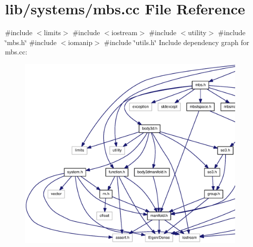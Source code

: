 \section{lib/systems/mbs.cc \-File \-Reference}
\label{mbs_8cc}
{\ttfamily \#include $<$limits$>$}\*
{\ttfamily \#include $<$iostream$>$}\*
{\ttfamily \#include $<$utility$>$}\*
{\ttfamily \#include \char`\"{}mbs.\-h\char`\"{}}\*
{\ttfamily \#include $<$iomanip$>$}\*
{\ttfamily \#include \char`\"{}utils.\-h\char`\"{}}\*
\-Include dependency graph for mbs.\-cc\-:
\nopagebreak
\begin{figure}[H]
\begin{center}
\leavevmode
\includegraphics[width=350pt]{mbs_8cc__incl}
\end{center}
\end{figure}
